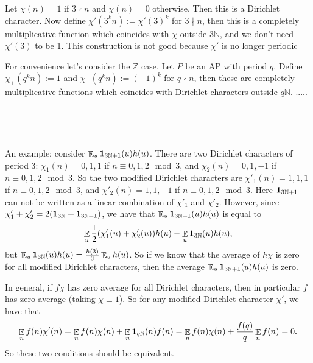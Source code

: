 \documentclass[11pt]{amsart}
\theoremstyle{definition}
\DeclareMathOperator*{\E}{\mathbb{E}}
\newcommand{\N}{{\mathbb N}}
\newcommand{\Z}{{\mathbb Z}}
\begin{document}
{\color{blue}

Let $\chi(n)=1$ if $3\nmid n$ and $\chi(n)=0$ otherwise. Then this is a Dirichlet character. Now define $\chi'(3^{k}n):=\chi'(3)^{k}$ for $3\nmid n$, then this is a completely multiplicative function which coincides with $\chi$ outside $3\N$, and we don't need $\chi'(3)$ to be 1. {\color{red} This construction is not good because $\chi'$ is no longer periodic}


For convenience let's consider the $\Z$ case.
Let $P$ be an AP with period $q$.  Define $\chi_{+}(q^{k}n):=1$ and $\chi_{-}(q^{k}n):=(-1)^{k}$ for $q\nmid n$, then these are  completely multiplicative functions which coincides with Dirichlet characters outside $q\N$. .....


\

\

An example: consider $\E_{u}\bold{1}_{3\N+1}(u)h(u)$. There are two Dirichlet characters of period 3: $\chi_{1}(n)=0,1,1$ if $n\equiv 0,1,2\mod 3$, and  $\chi_{2}(n)=0,1,-1$ if $n\equiv 0,1,2\mod 3$. So the two modified Dirichlet characters are $\chi'_{1}(n)=1,1,1$ if $n\equiv 0,1,2\mod 3$, and  $\chi'_{2}(n)=1,1,-1$ if $n\equiv 0,1,2\mod 3$. 
Here $\bold{1}_{3\N+1}$ can not be written as a linear combination of $\chi'_{1}$ and $\chi'_{2}$. However, since $\chi'_{1}+\chi'_{2}=2(\bold{1}_{3\N}+\bold{1}_{3\N+1})$, we have that  $\E_{u}\bold{1}_{3\N+1}(u)h(u)$ is equal to
$$\E_{u}\frac{1}{2}(\chi'_{1}(u)+\chi'_{2}(u))h(u)-\E_{u}\bold{1}_{3\N}(u)h(u),$$
but $\E_{u}\bold{1}_{3\N}(u)h(u)=\frac{h(3)}{3}\E_{u}h(u)$. So if we know that the average of $h\chi$ is zero for all modified Dirichlet characters, then the average $\E_{u}\bold{1}_{3\N+1}(u)h(u)$ is zero. 


In general, if $f\chi$ has zero average for all Dirichlet characters, then in particular $f$ has zero average (taking $\chi\equiv 1$). So for any modified Dirichlet character $\chi'$, we have that 
$$\E_{n}f(n)\chi'(n)=\E_{n}f(n)\chi(n)+\E_{n}\bold{1}_{q\N}(n)f(n)=\E_{n}f(n)\chi(n)+\frac{f(q)}{q}\E_{n}f(n)=0.$$
So these two conditions should be equivalent.


}

\fi

\end{document}
